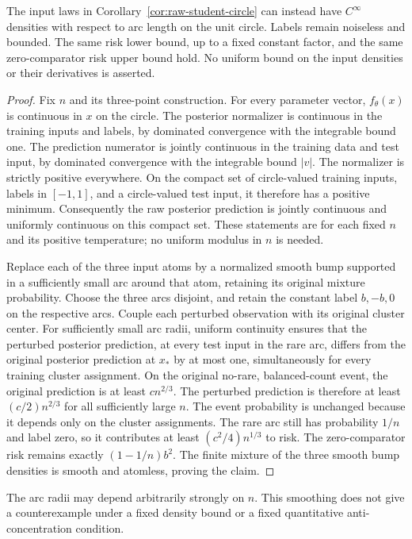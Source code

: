 \begin{corollary}
The input laws in Corollary~\ref{cor:raw-student-circle} can instead
have $C^\infty$ densities with respect to arc length on the unit
circle. Labels remain noiseless and bounded. The same risk lower
bound, up to a fixed constant factor, and the same zero-comparator
risk upper bound hold. No uniform bound on the input densities or
their derivatives is asserted.
\end{corollary}
\begin{proof}
Fix $n$ and its three-point construction. For every parameter vector,
$f_\theta(x)$ is continuous in $x$ on the circle. The posterior
normalizer is continuous in the training inputs and labels, by
dominated convergence with the integrable bound one. The prediction
numerator is jointly continuous in the training data and test input,
by dominated convergence with the integrable bound $|v|$.
The normalizer is strictly positive everywhere. On the compact set
of circle-valued training inputs, labels in $[-1,1]$, and a
circle-valued test input, it therefore has a positive minimum.
Consequently the raw posterior prediction is jointly continuous
and uniformly continuous on this compact set. These statements are
for each fixed $n$ and its positive temperature; no uniform modulus
in $n$ is needed.

Replace each of the three input atoms by a normalized smooth bump
supported in a sufficiently small arc around that atom, retaining
its original mixture probability. Choose the three arcs disjoint,
and retain the constant label $b,-b,0$ on the respective arcs.
Couple each perturbed observation with its original cluster center.
For sufficiently small arc radii, uniform continuity ensures that
the perturbed posterior prediction, at every test input in the rare
arc, differs from the original posterior prediction at $x_*$ by
at most one, simultaneously for every training cluster assignment.
On the original no-rare, balanced-count event, the original
prediction is at least $c n^{2/3}$. The perturbed prediction is
therefore at least $(c/2)n^{2/3}$ for all sufficiently large $n$.
The event probability is unchanged because it depends only on the
cluster assignments. The rare arc still has probability $1/n$ and
label zero, so it contributes at least $(c^2/4)n^{1/3}$ to risk.
The zero-comparator risk remains exactly $(1-1/n)b^2$.
The finite mixture of the three smooth bump densities is smooth
and atomless, proving the claim.
\end{proof}

The arc radii may depend arbitrarily strongly on $n$. This smoothing
does not give a counterexample under a fixed density bound or a
fixed quantitative anti-concentration condition.
